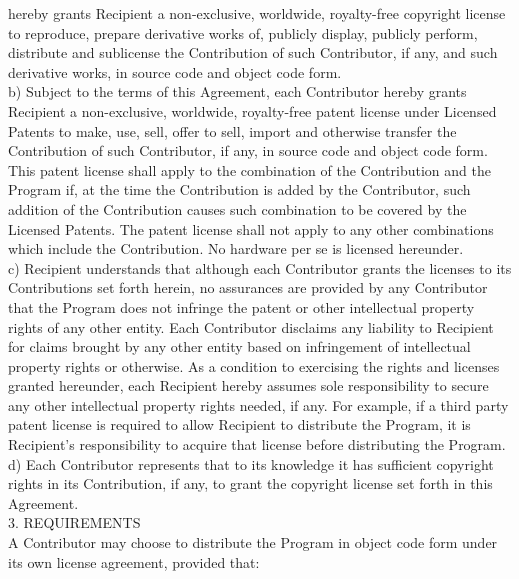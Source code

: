 {      hereby grants Recipient a non-exclusive, worldwide, royalty-free
      copyright license to reproduce, prepare derivative works of,
      publicly display, publicly perform, distribute and sublicense
      the Contribution of such Contributor, if any, and such
      derivative works, in source code and object code form.
\\[4pt]
      b) Subject to the terms of this Agreement, each Contributor
      hereby grants Recipient a non-exclusive, worldwide, royalty-free
      patent license under Licensed Patents to make, use, sell, offer
      to sell, import and otherwise transfer the Contribution of such
      Contributor, if any, in source code and object code form. This
      patent license shall apply to the combination of the
      Contribution and the Program if, at the time the Contribution is
      added by the Contributor, such addition of the Contribution
      causes such combination to be covered by the Licensed
      Patents. The patent license shall not apply to any other
      combinations which include the Contribution. No hardware per se
      is licensed hereunder.
\\[4pt]
      c) Recipient understands that although each Contributor grants
      the licenses to its Contributions set forth herein, no
      assurances are provided by any Contributor that the Program does
      not infringe the patent or other intellectual property rights of
      any other entity. Each Contributor disclaims any liability to
      Recipient for claims brought by any other entity based on
      infringement of intellectual property rights or otherwise. As a
      condition to exercising the rights and licenses granted
      hereunder, each Recipient hereby assumes sole responsibility to
      secure any other intellectual property rights needed, if
      any. For example, if a third party patent license is required to
      allow Recipient to distribute the Program, it is Recipient's
      responsibility to acquire that license before distributing the
      Program.
\\[4pt]
      d) Each Contributor represents that to its knowledge it has
      sufficient copyright rights in its Contribution, if any, to
      grant the copyright license set forth in this Agreement.
\\[4pt]
3. REQUIREMENTS
\\[4pt]
A Contributor may choose to distribute the Program in object code form
under its own license agreement, provided that:
\\[4pt]
}

